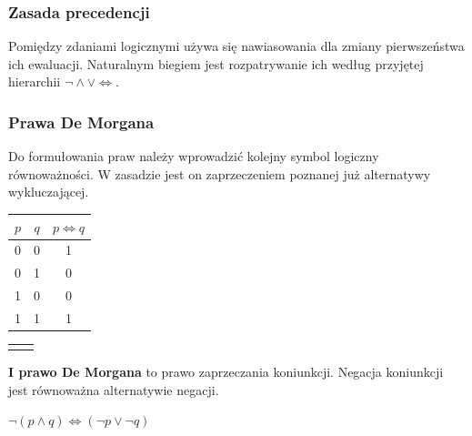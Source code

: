 \documentclass[a4paper,12pt]{article}
\begin{document}
\subsubsection{Zasada precedencji}
Pomiędzy zdaniami logicznymi używa się nawiasowania dla zmiany pierwszeństwa ich ewaluacji. Naturalnym biegiem jest rozpatrywanie ich według przyjętej hierarchii $\lnot \land \lor \iff$.

\subsubsection{Prawa De Morgana}
Do formułowania praw należy wprowadzić kolejny symbol logiczny równoważności. W zasadzie jest on zaprzeczeniem poznanej już alternatywy wykluczającej.

\begin{table}[h!]
\centering

\begin{minipage}{5.5cm}
\centering

\begin{tabular}{ | c | c || c | }
  \hline
  $p$ & $q$ & $p \iff q$ \\ \hline
  0 & 0 & 1 \\
  0 & 1 & 0 \\
  1 & 0 & 0 \\
  1 & 1 & 1 \\
  \hline
\end{tabular}
\end{minipage}
\begin{minipage}{11cm}
\begin{tabular}{  c r }
  & \\
\end{tabular}
\end{minipage}
\end{table}

\textbf{I prawo De Morgana} to prawo zaprzeczania koniunkcji. Negacja koniunkcji jest równoważna alternatywie negacji.

$\lnot (p \land q) \iff (\lnot p \lor \lnot q)$
\end{document}
